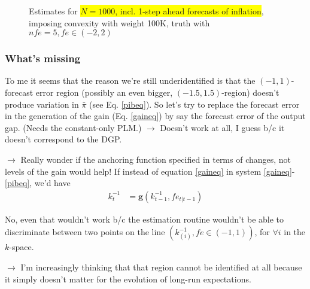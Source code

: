 \documentclass[11pt]{article}
\def \myFigPath {../../figures/}
\renewcommand{\[}{\begin{equation}}
\renewcommand{\]}{\end{equation}}
\def\myBiggerFigScale{0.4}
\def\myTinyFigScale{0.16}
\begin{document}
\begin{figure}[h!]
{}
\caption{Estimates for \colorbox{yellow}{$N=1000$,  incl. 1-step ahead forecasts of inflation}, imposing convexity with weight 100K, truth with $nfe=5, fe \in(-2,2)$}
\end{figure}

\subsubsection*{What's missing}
To me it seems that the reason we're still underidentified is that the $(-1,1)$-forecast error region (possibly an even bigger, $(-1.5, 1.5)$-region) doesn't produce variation in $\bar{\pi}$ (see Eq. \ref{pibeq}). So let's try to replace the forecast error in the generation of the gain (Eq. \ref{gaineq}) by say the forecast error of the output gap. (Needs the constant-only PLM.) $\rightarrow$ Doesn't work at all, I guess b/c it doesn't correspond to the DGP.

$\rightarrow$ Really wonder if the anchoring function specified in terms of changes, not levels of the gain would help! If instead of equation \ref{gaineq} in system \ref{gaineq}-\ref{pibeq}, we'd have
\begin{align}
k_t^{-1} &= \mathbf{g}(k_{t-1}^{-1},fe_{t|t-1}) \label{gaineqchanges}
\end{align}

No, even that wouldn't work b/c the estimation routine wouldn't be able to discriminate between two points on the line $(k^{-1}_{(i)}, fe \in (-1,1))$, for $\forall i$ in the $k$-space.

$\rightarrow$ I'm increasingly thinking that that region cannot be identified at all because it simply doesn't matter for the evolution of long-run expectations.
\end{document}
